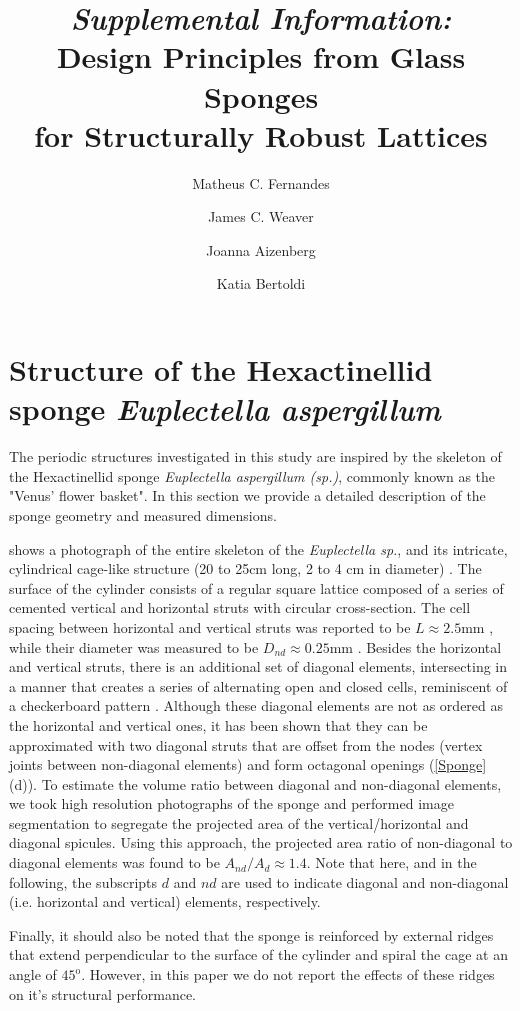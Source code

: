 \documentclass[10pt,twoside]{fernandes_supp}
\title{\textit{Supplemental Information:}\\ Design Principles from Glass Sponges \\for Structurally Robust Lattices}
\author[1]{Matheus C. Fernandes}
\author[2]{James C. Weaver}
\author[1,2,3]{Joanna Aizenberg}
\author[1,2,3,*]{Katia Bertoldi}
\affil[1]{John A. Paulson School of Engineering and Applied Sciences -- Harvard University, Cambridge, MA 02138}
\affil[2]{Wyss Institute -- Harvard University, Cambridge, MA 02138}
\affil[3]{Kavli Institute -- Harvard University, Cambridge, MA 02138}
\affil[*]{Corresponding author: \href{mailto:bertoldi@seas.harvard.edu}{bertoldi@seas.harvard.edu}}
\begin{document}
\maketitle
\linenumbers

\section{Structure of the Hexactinellid sponge \textit{Euplectella aspergillum}}\label{sec:params}
The periodic structures investigated in this study are inspired by the skeleton of the Hexactinellid sponge \textit{Euplectella aspergillum (sp.)}, commonly known as the "Venus' flower basket". In this section we provide a detailed description of the sponge geometry and measured dimensions.

 shows a photograph of the entire skeleton of the \textit{Euplectella sp.}, and its intricate, cylindrical cage-like structure (20 to 25cm long, 2 to 4 cm in diameter) \citep{aizenberg2005}. The surface of the cylinder consists of a regular square lattice composed of a series of cemented vertical and horizontal struts with circular cross-section. The cell spacing between horizontal and vertical struts was reported  to be $L\approx 2.5$mm \citep{weaver2007}, while their diameter was measured to be $D_{nd}\approx 0.25$mm \citep{weaver2007}. Besides the horizontal and vertical struts, there is an additional set of diagonal elements, intersecting in a manner that creates a series of alternating open and closed cells, reminiscent of a checkerboard pattern \citep{weaver2007}. Although these diagonal elements are not as ordered as the horizontal and vertical ones, it has been shown that they can be approximated with two diagonal struts that are offset from the nodes  (vertex joints between non-diagonal elements) and form octagonal openings (\cref{Sponge}(d)). To estimate the volume ratio between diagonal and non-diagonal elements, we took high resolution photographs of the sponge and performed image segmentation to segregate the projected area of the vertical/horizontal and diagonal spicules. Using this approach, the projected area ratio of non-diagonal to diagonal elements was found to be $A_{nd}/A_{d}\approx1.4$. Note that here, and in the following, the subscripts $d$ and $nd$ are used to indicate diagonal and non-diagonal (i.e. horizontal and vertical) elements, respectively. 

Finally, it should also be noted that the sponge is reinforced by external ridges that extend perpendicular to the surface of the cylinder and spiral the cage at an angle of $45^\text{o}$. However, in this paper we do not report the effects of these ridges on it's structural performance.
\end{document}
